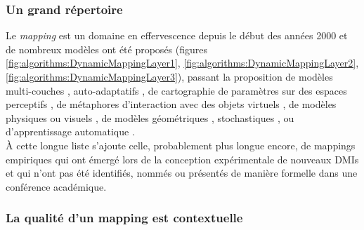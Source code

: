 \subsubsection{Un grand répertoire}

\noindent Le \textit{mapping} est un domaine en effervescence depuis le début des années 2000 et de nombreux modèles ont été proposés (figures \ref{fig:algorithms:DynamicMappingLayer1}, \ref{fig:algorithms:DynamicMappingLayer2}, \ref{fig:algorithms:DynamicMappingLayer3}), passant la proposition de modèles multi-couches \cite{wanderley_escher-modeling_1998, hunt_mapping_2002}, auto-adaptatifs \cite{verfaille_mapping_2006}, de cartographie de paramètres sur des espaces perceptifs \cite{wessel_timbre_1979, wyse_instrumentalizing_2010,schwarz_sound_2012, tubb_divergent_2014}, de métaphores d'interaction avec des objets virtuels \cite{wessel_intimate_2002}, de modèles physiques ou visuels \cite{momeni_dynamic_2006}, de modèles géométriques \cite{van_nort_choice_2004}, stochastiques \cite{dabby_musical_1996}, ou d'apprentissage automatique \cite{fiebrink_real-time_2011, caramiaux_mapping_2014, francoise_motion-sound_2015}.\\
\indent À cette longue liste s'ajoute celle, probablement plus longue encore, de mappings empiriques qui ont émergé lors de la conception expérimentale de nouveaux \glspl{DMI} et qui n'ont pas été identifiés, nommés ou présentés de manière formelle dans une conférence académique.

\subsubsection{La qualité d'un mapping est contextuelle}


